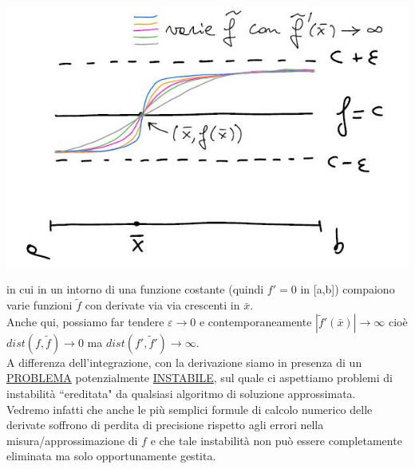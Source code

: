 \documentclass[12pt,a4paper]{article}
\begin{document}
\begin{center}
    \includegraphics[scale=0.5]{lez17_img2.JPG}
\end{center}
in cui in un intorno di una funzione costante (quindi $f'=0$ in [a,b]) compaiono varie funzioni $\tilde{f}$ con derivate via via crescenti in $\bar{x}$.\\
Anche qui, possiamo far tendere $\varepsilon\rightarrow0$ e contemporaneamente $|\tilde{f}'(\bar{x})|\rightarrow\infty$ cioè $dist(f,\tilde{f})\rightarrow0$ ma $dist(f',\tilde{f}')\rightarrow\infty$.\\A differenza dell'integrazione, con la derivazione siamo in presenza di un \uline{PROBLEMA} potenzialmente \uline{INSTABILE}, sul quale ci aspettiamo problemi di instabilità ``ereditata" da qualsiasi algoritmo di soluzione approssimata.\\Vedremo infatti che anche le più semplici formule di calcolo numerico delle derivate soffrono di perdita di precisione rispetto agli errori nella misura/approssimazione di $f$ e che tale instabilità non può essere completamente eliminata ma solo opportunamente gestita.
\end{document}
